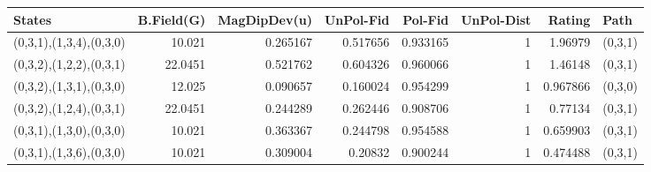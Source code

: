 \begin{tabular}{lrrrrrrl}
\hline
 States                  &   B.Field(G) &   MagDipDev(u) &   UnPol-Fid &   Pol-Fid &   UnPol-Dist &   Rating & Path    \\
\hline
 (0,3,1),(1,3,4),(0,3,0) &      10.021  &       0.265167 &    0.517656 &  0.933165 &            1 & 1.96979  & (0,3,1) \\
 (0,3,2),(1,2,2),(0,3,1) &      22.0451 &       0.521762 &    0.604326 &  0.960066 &            1 & 1.46148  & (0,3,1) \\
 (0,3,2),(1,3,1),(0,3,0) &      12.025  &       0.090657 &    0.160024 &  0.954299 &            1 & 0.967866 & (0,3,0) \\
 (0,3,2),(1,2,4),(0,3,1) &      22.0451 &       0.244289 &    0.262446 &  0.908706 &            1 & 0.77134  & (0,3,1) \\
 (0,3,1),(1,3,0),(0,3,0) &      10.021  &       0.363367 &    0.244798 &  0.954588 &            1 & 0.659903 & (0,3,1) \\
 (0,3,1),(1,3,6),(0,3,0) &      10.021  &       0.309004 &    0.20832  &  0.900244 &            1 & 0.474488 & (0,3,1) \\
\hline
\end{tabular}